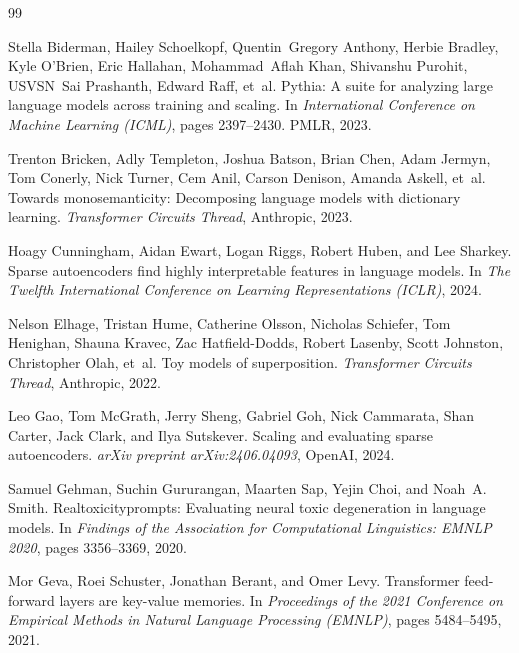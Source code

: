 \documentclass[10pt,twocolumn,letterpaper]{article}
\begin{document}
\begin{thebibliography}{99}

Stella Biderman, Hailey Schoelkopf, Quentin~Gregory Anthony, Herbie Bradley, Kyle O'Brien, Eric Hallahan, Mohammad~Aflah Khan, Shivanshu Purohit, USVSN~Sai Prashanth, Edward Raff, et~al.
\newblock Pythia: A suite for analyzing large language models across training and scaling.
\newblock In \emph{International Conference on Machine Learning (ICML)}, pages 2397--2430. PMLR, 2023.

Trenton Bricken, Adly Templeton, Joshua Batson, Brian Chen, Adam Jermyn, Tom Conerly, Nick Turner, Cem Anil, Carson Denison, Amanda Askell, et~al.
\newblock Towards monosemanticity: Decomposing language models with dictionary learning.
\newblock \emph{Transformer Circuits Thread}, Anthropic, 2023.

Hoagy Cunningham, Aidan Ewart, Logan Riggs, Robert Huben, and Lee Sharkey.
\newblock Sparse autoencoders find highly interpretable features in language models.
\newblock In \emph{The Twelfth International Conference on Learning Representations (ICLR)}, 2024.

Nelson Elhage, Tristan Hume, Catherine Olsson, Nicholas Schiefer, Tom Henighan, Shauna Kravec, Zac Hatfield-Dodds, Robert Lasenby, Scott Johnston, Christopher Olah, et~al.
\newblock Toy models of superposition.
\newblock \emph{Transformer Circuits Thread}, Anthropic, 2022.

Leo Gao, Tom McGrath, Jerry Sheng, Gabriel Goh, Nick Cammarata, Shan Carter, Jack Clark, and Ilya Sutskever.
\newblock Scaling and evaluating sparse autoencoders.
\newblock \emph{arXiv preprint arXiv:2406.04093}, OpenAI, 2024.

Samuel Gehman, Suchin Gururangan, Maarten Sap, Yejin Choi, and Noah~A. Smith.
\newblock Realtoxicityprompts: Evaluating neural toxic degeneration in language models.
\newblock In \emph{Findings of the Association for Computational Linguistics: EMNLP 2020}, pages 3356--3369, 2020.

Mor Geva, Roei Schuster, Jonathan Berant, and Omer Levy.
\newblock Transformer feed-forward layers are key-value memories.
\newblock In \emph{Proceedings of the 2021 Conference on Empirical Methods in Natural Language Processing (EMNLP)}, pages 5484--5495, 2021.


\end{thebibliography}
\end{document}
